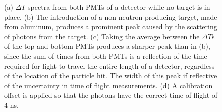 \begin{figure}[htbp]

\caption{
(a) $\Delta T$ spectra from both PMTs of a detector while no target is in place.
(b) The introduction of a non-neutron producing target, made from aluminum, produces a prominent peak caused by the scattering of photons from the target.
(c) Taking the average between the $\Delta T$s of the top and bottom PMTs produces a sharper peak than in (b), since the sum of times from both PMTs is a reflection of the time required for light to travel the entire length of a detector, regardless of the location of the particle hit.
The width of this peak if reflective of the uncertainty in time of flight measurements. 
(d) A calibration offset is applied so that the photons have the correct time of flight of 4 ns. }
\label{fig:ToFDetermination}
\end{figure}
   
